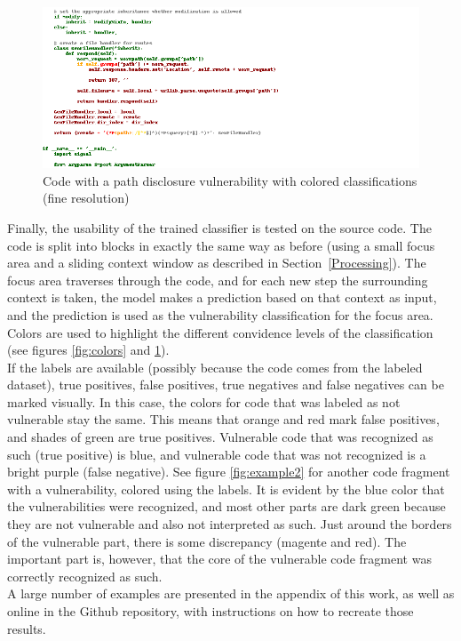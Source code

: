 \documentclass[
a4paper,
pagesize,
pdftex,
12pt,
twoside, %
BCOR=5mm, %
ngerman,
fleqn,
final,
]{scrartcl}
\begin{document}
	\begin{figure}[h]
		\centering
		\includegraphics[width=1\textwidth]{img/examplePathDisclosure.png}
		\caption{Code with a path disclosure vulnerability with colored classifications (fine resolution)}
		\label{fig:example}
	\end{figure}
	Finally, the usability of the trained classifier is tested on the source code. The code is split into blocks in exactly the same way as before (using a small focus area and a sliding context window as described in Section~\ref{Processing}). The focus area traverses through the code, and for each new step the surrounding context is taken, the model makes a prediction based on that context as input, and the prediction is used as the vulnerability classification for the focus area. Colors are used to highlight the different convidence levels of the classification (see figures \ref{fig:colors} and \ref{fig:example}).\\	
	If the labels are available (possibly because the code comes from the labeled dataset), true positives, false positives, true negatives and false negatives can be marked visually. In this case, the colors for code that was labeled as not vulnerable stay the same. This means that orange and red mark false positives, and shades of green are true positives. Vulnerable code that was recognized as such (true positive) is blue, and vulnerable code that was not recognized is a bright purple (false negative). See figure \ref{fig:example2} for another code fragment with a vulnerability, colored using the labels. It is evident by the blue color that the vulnerabilities were recognized, and most other parts are dark green because they are not vulnerable and also not interpreted as such. Just around the borders of the vulnerable part, there is some discrepancy (magente and red). The important part is, however, that the core of the vulnerable code fragment was correctly recognized as such.\\
	A large number of examples are presented in the appendix of this work, as well as online in the Github repository, with instructions on how to recreate those results.
	
\end{document}
